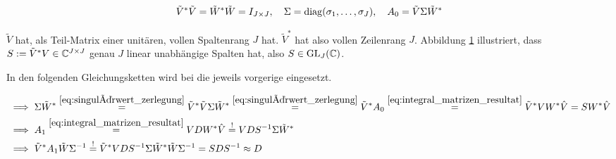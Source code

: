 \begin{align} \label{eq:singulärwert_zerlegung}
    \tilde V^\ast \tilde V
    =
    \tilde W^\ast \tilde W
    =
    I_{J \times J},
    \quad
    \Sigma = \operatorname{diag}(\sigma_1, \dots, \sigma_J),
    \quad
    A_0 = \tilde V \Sigma \tilde W^\ast
\end{align}

$\tilde V$ hat, als Teil-Matrix einer unitären, vollen Spaltenrang $J$ hat.
$\tilde V^\ast$ hat also vollen Zeilenrang $J$.
Abbildung \ref{fig:rang_2} illustriert, dass $S := \tilde V^\ast V \in \mathbb{C}^{J \times J}$ genau $J$ linear unabhängige Spalten hat, also $S \in \operatorname{GL}_J(\mathbb{C})$.

\begin{figure}[!ht]
    \centering
    \caption{}
    \label{fig:rang_2}
\end{figure}

In den folgenden Gleichungsketten wird bei \Quote{!} die jeweils vorgerige eingesetzt.

\begin{align*}
    & \implies
    \Sigma \tilde W^\ast
    \stackrel
    {
        \eqref{eq:singulärwert_zerlegung}
    }{=}
    \tilde V^\ast \tilde V \Sigma \tilde W^\ast
    \stackrel
    {
        \eqref{eq:singulärwert_zerlegung}
    }{=}
    \tilde V^\ast A_0
    \stackrel
    {
        \eqref{eq:integral_matrizen_resultat}
    }{=}
    \tilde V^\ast V W^\ast \hat V
    =
    S W^\ast \hat V \\
    & \implies
    A_1
    \stackrel
    {
        \eqref{eq:integral_matrizen_resultat}
    }{=}
    V D W^\ast \hat V
    \stackrel{!}{=}
    V D S^{-1} \Sigma \tilde W^\ast \\
    & \implies
    \tilde V^\ast A_1 \tilde W \Sigma^{-1}
    \stackrel{!}{=}
    \tilde V^\ast V D S^{-1} \Sigma \tilde W^\ast \tilde W \Sigma^{-1}
    =
    S D S^{-1}
    \approx
    D
\end{align*}

